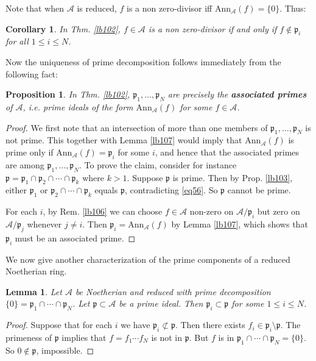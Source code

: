 \documentclass[12pt,b5paper,notitlepage]{report}
\theoremstyle{definition}
\theoremstyle{plain}
\newtheorem{pp}[df]{Proposition}
\newtheorem{co}[df]{Corollary}
\newtheorem{lm}[df]{Lemma}
\newcommand{\mc}{\mathcal}
\newcommand{\pk}{\mathfrak p}
\newcommand{\Ann}{\mathrm{Ann}}
\numberwithin{equation}{section}
\begin{document}
Note that when $\mc A$ is reduced, $f$ is a non zero-divisor iff $\Ann_{\mc A}(f)=\{0\}$. Thus:
\begin{co}\label{lb120}
In Thm. \ref{lb102}, $f\in \mc A$ is a non zero-divisor if and only if $f\notin\pk_i$ for all $1\leq i\leq N$.
\end{co}






Now the uniqueness of prime decomposition follows immediately from the following fact:

\begin{pp}\label{lb291}
In Thm. \ref{lb102}, $\pk_1,\dots,\pk_N$ are precisely the \textbf{associated primes}  of $\mc A$, i.e. prime ideals of the form $\Ann_{\mc A}(f)$ for some $f\in \mc A$.
\end{pp}


\begin{proof}
We first note that an intersection of more than one members of $\pk_1,\dots,\pk_N$ is not prime. This together with Lemma \ref{lb107} would imply that $\Ann_{\mc A}(f)$ is prime only if $\Ann_{\mc A}(f)=\pk_i$ for some $i$, and hence that the associated primes are among $\pk_1,\dots,\pk_N$. To prove the claim, consider for instance $\pk=\pk_1\cap\pk_2\cap\cdots\cap\pk_k$ where $k>1$. Suppose $\pk$ is prime. Then by Prop. \ref{lb103}, either $\pk_1$ or $\pk_2\cap\cdots\cap\pk_k$ equals $\pk$, contradicting \eqref{eq56}. So $\pk$ cannot be prime.

For each $i$, by Rem. \ref{lb106} we can choose $f\in \mc A$ non-zero on $\mc A/\pk_i$ but zero on $\mc A/\pk_j$ whenever $j\neq i$. Then $\pk_i=\Ann_{\mc A}(f)$ by Lemma \ref{lb107}, which shows that $\pk_i$ must be an associated prime.
\end{proof}


We now give another characterization of the prime components of a reduced Noetherian ring.

\begin{lm}\label{lb376}
Let $\mc A$ be Noetherian and reduced with prime decomposition $\{0\}=\pk_1\cap\cdots\cap\pk_N$. Let $\pk\subset\mc A$ be a prime ideal. Then $\pk_i\subset\pk$ for some $1\leq i\leq N$.
\end{lm}

\begin{proof}
Suppose that for each $i$ we have $\pk_i\nsubset\pk$. Then there exists $f_i\in\pk_i\setminus\pk$. The primeness of $\pk$ implies that  $f=f_1\cdots f_N$ is not in $\pk$. But $f$ is in $\pk_1\cap\cdots\cap \pk_N=\{0\}$. So $0\notin\pk$, impossible.
\end{proof}
\end{document}
